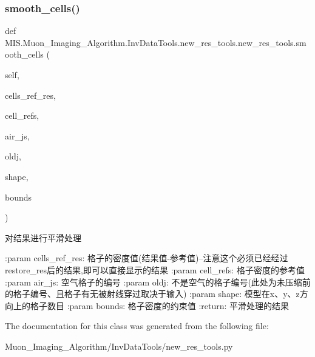 \subsubsection{\texorpdfstring{smooth\+\_\+cells()}{smooth\_cells()}}
{\footnotesize\ttfamily def M\+I\+S.\+Muon\+\_\+\+Imaging\+\_\+\+Algorithm.\+Inv\+Data\+Tools.\+new\+\_\+res\+\_\+tools.\+new\+\_\+res\+\_\+tools.\+smooth\+\_\+cells (\begin{DoxyParamCaption}\item[{}]{self,  }\item[{}]{cells\+\_\+ref\+\_\+res,  }\item[{}]{cell\+\_\+refs,  }\item[{}]{air\+\_\+js,  }\item[{}]{oldj,  }\item[{}]{shape,  }\item[{}]{bounds }\end{DoxyParamCaption})}

\begin{DoxyVerb}对结果进行平滑处理

:param cells_ref_res: 格子的密度值(结果值-参考值)--注意这个必须已经经过 restore_res后的结果,即可以直接显示的结果
:param cell_refs: 格子密度的参考值
:param air_js: 空气格子的编号
:param oldj: 不是空气的格子编号(此处为未压缩前的格子编号、且格子有无被射线穿过取决于输入)
:param shape: 模型在x、y、z方向上的格子数目
:param bounds: 格子密度的约束值
:return: 平滑处理的结果
\end{DoxyVerb}
 

The documentation for this class was generated from the following file\+:\begin{DoxyCompactItemize}
\item 
Muon\+\_\+\+Imaging\+\_\+\+Algorithm/\+Inv\+Data\+Tools/new\+\_\+res\+\_\+tools.\+py\end{DoxyCompactItemize}
